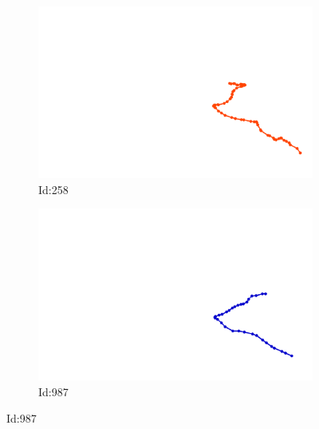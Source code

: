 \documentclass[12pt,twoside]{report}
\begin{document}
\begin{figure}
\centering
\begin{subfigure}[b]{0.20\textwidth}
\centering
\includegraphics[width=\textwidth]{../../trajectories/258.png}
\caption{Id:258}
\end{subfigure}
\begin{subfigure}[b]{0.20\textwidth}
\centering
\includegraphics[width=\textwidth]{../../trajectories/987.png}
\caption{Id:987}
\end{subfigure}
\end{figure}
\end{document}
